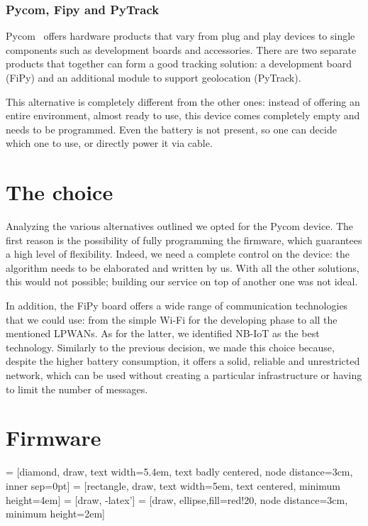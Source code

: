 \subsubsection{Pycom, Fipy and PyTrack}
Pycom~\cite{pycom} offers hardware products that vary from plug and play devices to single components such as development boards and accessories. There are two separate products that together can form a good tracking solution: a development board (FiPy) and an additional module to support geolocation (PyTrack).

This alternative is completely different from the other ones: instead of offering an entire environment, almost ready to use, this device comes completely empty and needs to be programmed. Even the battery is not present, so one can decide which one to use, or directly power it via cable. 

\section{The choice}
\label{sec:track_choice}

Analyzing the various alternatives outlined we opted for the Pycom device. The first reason is the possibility of fully programming the firmware, which guarantees a high level of flexibility. Indeed, we need a complete control on the device: the algorithm needs to be elaborated and written by us. With all the other solutions, this would not possible; building our service on top of another one was not ideal.

In addition, the FiPy board offers a wide range of communication technologies that we could use: from the simple Wi-Fi for the developing phase to all the mentioned LPWANs. As for the latter, we identified NB-IoT as the best technology. Similarly to the previous decision, we made this choice because, despite the higher battery consumption, it offers a solid, reliable and unrestricted network, which can be used without creating a particular infrastructure or having to limit the number of messages.

\section{Firmware}
\label{sec:track_firmware}

 = [diamond, draw, 
    text width=5.4em, text badly centered, node distance=3cm, inner sep=0pt]
 = [rectangle, draw,
    text width=5em, text centered, minimum height=4em]
 = [draw, -latex']
 = [draw, ellipse,fill=red!20, node distance=3cm, minimum height=2em]
    
